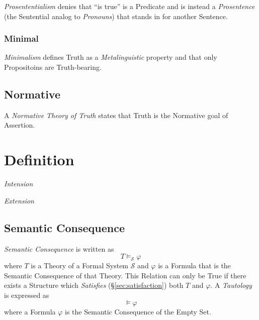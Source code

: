 \emph{Prosententialism} denies that ``is true'' is a Predicate and is
instead a \emph{Prosentence} (the Sentential analog to
\emph{Pronouns}) that stands in for another Sentence.

\subsubsection{Minimal}

\emph{Minimalism} defines Truth as a \emph{Metalinguistic} property
and that only Propositoins are Truth-bearing.

\subsection{Normative}

A \emph{Normative Theory of Truth} states that Truth is the Normative
goal of Assertion.



\section{Definition}\label{sec:semantic_definition}

\emph{Intension}

\emph{Extension}



\subsection{Semantic Consequence}\label{sec:semantic_consequence}

\emph{Semantic Consequence} is written as
\[
    T \vDash_{\mathcal{S}} \varphi
\]
where $T$ is a Theory of a Formal System $\mathcal{S}$ and $\varphi$
is a Formula that is the Semantic Consequence of that Theory. This
Relation can only be True if there exists a Structure which
\emph{Satisfies} (\S\ref{sec:satisfaction}) both $T$ and
$\varphi$. A \emph{Tautology} is expressed as
\[
    \vDash {\varphi}
\]
where a Formula $\varphi$ is the Semantic Consequence of the Empty
Set.



